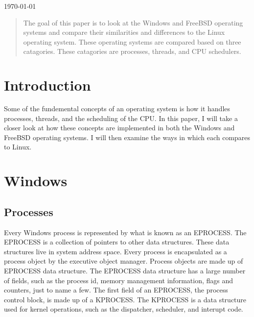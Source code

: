 \documentclass[journal,letterpaper,draftclsnofoot,onecolumn,10pt]{IEEEtran}
\begin{document}
\begin{titlepage}

{\large \today}\\[3cm] %

\begin{abstract}
The goal of this paper is to look at the Windows and FreeBSD operating systems and compare their similarities and differences to the Linux operating system. These operating systems are compared based on three catagories. These catagories are processes, threads, and CPU schedulers.
\end{abstract}

\vfill %

\pagebreak

\end{titlepage}

\setlength{\parindent}{3ex}

\section{Introduction}
Some of the fundemental concepts of an operating system is how it handles processes, threads, and the scheduling of the CPU. In this paper, I will take a closer look at how these concepts are implemented in both the Windows and FreeBSD operating systems. I will then examine the ways in which each compares to Linux.

\section{Windows}

\subsection{Processes}
Every Windows process is represented by what is known as an EPROCESS. The EPROCESS is a collection of pointers to other data structures. These data structures live in system address space. Every process is encapsulated as a process object by the executive object manager. Process objects are made up of EPROCESS data structure. The EPROCESS data structure has a large number of fields, such as the process id, memory management information, flags and counters, just to name a few. The first field of an EPROCESS, the process control block, is made up of a KPROCESS. The KPROCESS is a data structure used for kernel operations, such as the dispatcher, scheduler, and interupt code.\cite{1ris12}
\end{document}
